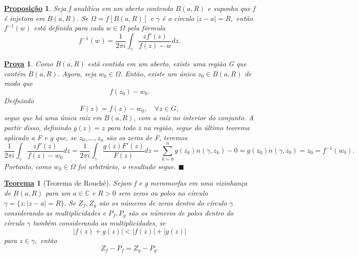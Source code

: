 \documentclass{article}
\newtheorem*{theorem*}{\underline{Teorema}}
\newtheorem*{proof*}{\underline{Prova}}
\newtheorem*{prop*}{\underline{Proposi\c c\~ao}}
\renewcommand\qedsymbol{$\blacksquare$}
\begin{document}
  \begin{prop*}
    Seja f analítica em um aberto contendo \(\overline{B(a, R)}\) e suponha que f é injetora em \(\overline{B(a, R)}.\) Se \(\Omega = f[B(a, R)]\) e \(\gamma \) é o círculo
    \(|z-a| = R,\) então \(f^{-1}(w)\) está definida para cada \(w\in \Omega \) pela fórmula 
    \[
      f^{-1}(w) = \frac{1}{2\pi i}\int_{\gamma }^{}\frac{zf'(z)}{f(z)-w}dz.
    \]
  \end{prop*}
  \begin{proof*}
    Como \(\overline{B(a, R)}\) está contida em um aberto, existe uma região G que contém \(\overline{B(a, R)}.\) Agora, seja \(w_{0}\in\Omega .\) Então,
    existe um único \(z_{0}\in \overline{B(a, R)}\) de modo que 
    \[
      f(z_{0}) - w_{0}.
    \]
    Deifnindo 
    \[
      F(z) = f(z)-w_{0},\quad \forall z\in G,
    \]
    segue que há uma única raíz em \(\overline{B(a, R)}\), com a raíz no interior do conjunto. A partir disso, definindo \(g(z) = z\) para todo z na região, segue do último teorema
    aplicado a F e g que, se \(z_{0},\dotsc , z_{n}\) são os zeros de F, teremos 
    \[
      \frac{1}{2\pi i}\int_{\gamma }^{}\frac{zf'(z)}{f(z) - w_{0}}dz = \frac{1}{2\pi i}\int_{\gamma }^{}\frac{g(z)F'(z)}{F(z)}dz = \sum\limits_{k=0}^{n}g(z_{k})n(\gamma , z_{k}) - 0 = g(z_{0})n(\gamma , z_{0}) = z_{0} = f^{-1}(w_{0}).
    \]
    Portanto, como \(w_{0}\in \Omega \) foi arbitrário, o resultado segue. \qedsymbol
  \end{proof*}
  \hypertarget{rouche}{\begin{theorem*}[Teorema de Rouché]
      Sejam f e g meromorfas em uma vizinhança de \(\overline{B(a, R)}\) para um \(a\in \mathbb{C}\) e \(R > 0\) sem zeros ou polos no círculo \(\gamma = \{z: |z-a| = R\}.\) 
      Se \(Z_{f}, Z_{g}\) são os números de zeros dentro do círculo \(\gamma \) considerando as multiplicidades e \(P_{f}, P_{g}\) são os números de polos dentro do círculo \(\gamma \) também
      considerando as multiplicidades, se 
      \[
        |f(z) + g(z)| < |f(z)| + |g(z)|
      \]
      para \(z\in \gamma ,\) então 
      \[
        Z_{f} - P_{f} = Z_{g} - P_{g}.
      \]
  \end{theorem*}}
\end{document}
